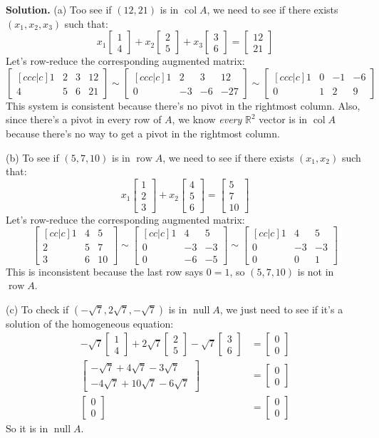 \documentclass[11pt, letterpaper]{report}
\newenvironment{notes}{}{}
\newenvironment{book}{}{}
\newcommand{\R}{\mathbb{R}}
\DeclareMathOperator{\col}{col}
\DeclareMathOperator{\row}{row}
\DeclareMathOperator{\nul}{null}
\newcommand{\bbvec}[2]{
  \begin{bmatrix} #1 \\ #2 \end{bmatrix}
}
\newcommand{\bbbvec}[3]{
  \begin{bmatrix} #1 \\ #2 \\ #3 \end{bmatrix}
}
\begin{document}
\begin{notes}
\vfill 
\newpage
\end{notes}

\begin{book}
\textbf{Solution.} (a) Too see if $(12,21)$ is in $\col A$, we need to see if there exists $(x_1,x_2,x_3)$ such that:
\[x_1 \bbvec{1}{4} + x_2 \bbvec{2}{5} + x_3 \bbvec{3}{6}= \bbvec{12}{21}\]
Let's row-reduce the corresponding augmented matrix:
\[\begin{bmatrix}[ccc|c]
1 & 2 & 3 & 12 \\
4 & 5 & 6 & 21
\end{bmatrix} \sim \begin{bmatrix}[ccc|c]
1 & 2 & 3 & 12 \\
0 & -3 & -6 & -27
\end{bmatrix} \sim \begin{bmatrix}[ccc|c]
1 & 0 & -1 & -6 \\
0 & 1 & 2 & 9
\end{bmatrix}\]
This system is consistent because there's no pivot in the rightmost column. Also, since there's a pivot in every row of $A$, we know \emph{every} $\R^2$ vector is in $\col A$ because there's no way to get a pivot in the rightmost column.

(b) To see if $(5,7,10)$ is in $\row A$, we need to see if there exists $(x_1,x_2)$ such that:
\[x_1 \bbbvec{1}{2}{3} + x_2 \bbbvec{4}{5}{6} = \bbbvec{5}{7}{10}\]
Let's row-reduce the corresponding augmented matrix:
\[\begin{bmatrix}[cc|c]
1 & 4 & 5 \\
2 & 5 & 7 \\
3 & 6 & 10
\end{bmatrix} \sim \begin{bmatrix}[cc|c]
1 & 4 & 5 \\
0 & -3 & -3 \\
0 & -6 & -5
\end{bmatrix} \sim \begin{bmatrix}[cc|c]
1 & 4 & 5 \\
0 & -3 & -3 \\
0 & 0 & 1
\end{bmatrix}\]
This is inconsistent because the last row says $0=1$, so $(5,7,10)$ is not in $\row A$.

(c) To check if $(-\sqrt{7}, 2\sqrt{7}, -\sqrt{7})$ is in $\nul A$, we just need to see if it's a solution of the homogeneous equation:
\begin{align*}
-\sqrt{7} \bbvec{1}{4} +2\sqrt{7} \bbvec{2}{5} -\sqrt{7} \bbvec{3}{6} &= \bbvec{0}{0} \\
 \bbvec{-\sqrt{7}+4\sqrt{7}-3\sqrt{7}}{-4\sqrt{7}+10\sqrt{7} -6\sqrt{7}} &= \bbvec{0}{0} \\
\bbvec{0}{0} &= \bbvec{0}{0}
\end{align*}
So it is in $\nul A$. \blacksquare
\end{book}
\end{document}
